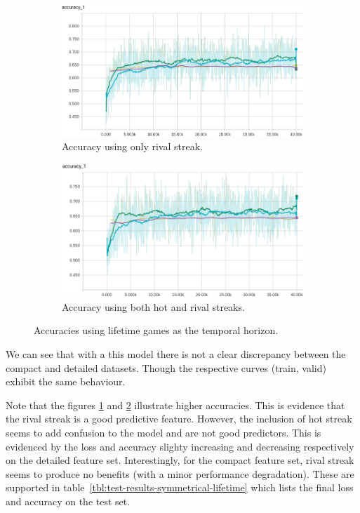 \documentclass{article} %
\begin{document}
\begin{figure}[!htb]
  \begin{subfigure}{0.5\textwidth}
    \includegraphics[width=\linewidth]{plots/model1/lifetime/streak-r/accuracy.png}
    \caption{Accuracy using only rival streak.}\label{fig:lifetime-r-accuracy}
  \end{subfigure}
  \begin{subfigure}{0.5\textwidth}
    \includegraphics[width=\linewidth]{plots/model1/lifetime/streak-hr/accuracy.png}
    \caption{Accuracy using both hot and rival streaks.}\label{fig:lifetime-hr-accuracy}
  \end{subfigure}
  \caption{Accuracies using lifetime games as the temporal horizon.}
  \label{fig:lifetime-accuracies}
\end{figure}

We can see that with a this model there is not a clear discrepancy between the compact and detailed datasets.
Though the respective curves (train, valid) exhibit the same behaviour.

Note that the figures \ref{fig:lifetime-r-accuracy} and \ref{fig:lifetime-hr-accuracy} illustrate higher accuracies.
This is evidence that the rival streak is a good predictive feature.
However, the inclusion of hot streak seems to add confusion to the model and are not good predictors.
This is evidenced by the loss and accuracy slighty increasing and decreasing respectively on the detailed feature set.
Interestingly, for the compact feature set, rival streak seems to produce no benefits (with a minor performance degradation).
These are supported in table~\ref{tbl:test-results-symmetrical-lifetime} which lists the final loss and accuracy on the test set.
\end{document}
